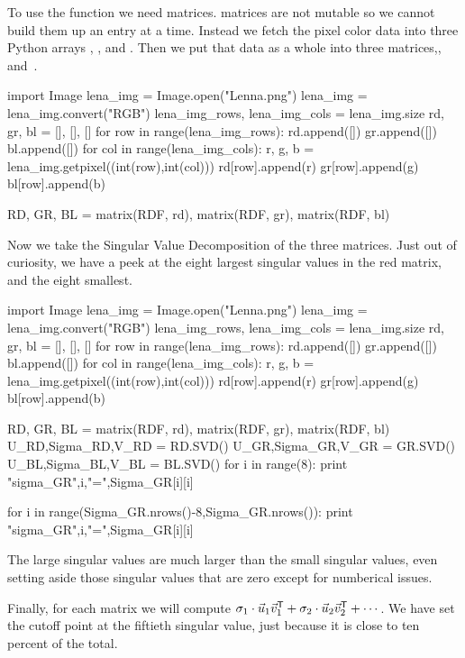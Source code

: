 To use the  function we need \Sage{} matrices.
\Sage{} matrices are not mutable so we cannot build them up an entry at a time.
Instead we fetch the pixel color data into  
three Python arrays , ,
and .
Then we put that data as a whole 
into three \Sage{} matrices,,
 and~.
\begin{sageoutput}[d,0,4]
import Image
lena_img = Image.open("Lenna.png")
lena_img = lena_img.convert("RGB")
lena_img_rows, lena_img_cols = lena_img.size
rd, gr, bl = [], [], []
for row in range(lena_img_rows):
    rd.append([])
    gr.append([])
    bl.append([])
    for col in range(lena_img_cols):
        r, g, b = lena_img.getpixel((int(row),int(col)))
        rd[row].append(r)
        gr[row].append(g)
        bl[row].append(b)

RD, GR, BL = matrix(RDF, rd), matrix(RDF, gr), matrix(RDF, bl)
\end{sageoutput}

Now we take the Singular Value Decomposition of the three matrices.
Just out of curiosity, we have a peek at the eight largest singular
values in the red matrix, and the eight smallest.
\begin{sageoutput}[d,0,16]
import Image
lena_img = Image.open("Lenna.png")
lena_img = lena_img.convert("RGB")
lena_img_rows, lena_img_cols = lena_img.size
rd, gr, bl = [], [], []
for row in range(lena_img_rows):
    rd.append([])
    gr.append([])
    bl.append([])
    for col in range(lena_img_cols):
        r, g, b = lena_img.getpixel((int(row),int(col)))
        rd[row].append(r)
        gr[row].append(g)
        bl[row].append(b)

RD, GR, BL = matrix(RDF, rd), matrix(RDF, gr), matrix(RDF, bl)
U_RD,Sigma_RD,V_RD = RD.SVD()
U_GR,Sigma_GR,V_GR = GR.SVD()
U_BL,Sigma_BL,V_BL = BL.SVD()
for i in range(8):
    print "sigma_GR",i,"=",Sigma_GR[i][i]

for i in range(Sigma_GR.nrows()-8,Sigma_GR.nrows()):
    print "sigma_GR",i,"=",Sigma_GR[i][i]

\end{sageoutput}
The large singular values are much larger than the small singular values,
even setting aside those singular values that are zero except for numberical
issues.


Finally, for each matrix we will compute 
$\sigma_1\cdot\vec{u}_1{{\vec{v}}^{\textsf{T}}}_1+\sigma_2\cdot\vec{u}_2{{\vec{v}}^{\textsf{T}}}_2
   +\cdots$.
We have set the cutoff point at the fiftieth singular value, just because it
is close to ten percent of the total.

